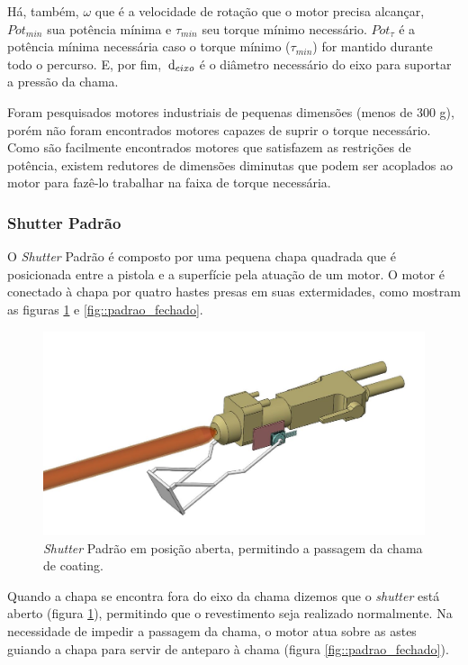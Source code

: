 Há, também, $\omega$ que é a velocidade de rotação que o motor precisa alcançar,
$Pot_{min}$ sua potência mínima e $\tau_{min}$ seu torque mínimo necessário.
$Pot_{\tau}$ é a potência mínima necessária caso o torque mínimo ($\tau_{min}$)
for mantido durante todo o percurso. E, por fim, $\,\mathrm{d}_{eixo}$ é o diâmetro necessário do eixo para suportar a
pressão da chama.

Foram pesquisados motores industriais de pequenas dimensões (menos de 300 g),
porém não foram encontrados motores capazes de suprir o torque necessário. Como
são facilmente encontrados motores que satisfazem as restrições de potência,
existem redutores de dimensões diminutas que podem ser acoplados ao motor para
fazê-lo trabalhar na faixa de torque necessária.


\subsubsection{Shutter Padrão}

O \textit{Shutter} Padrão é composto por uma pequena chapa quadrada que é
posicionada entre a pistola e a superfície pela atuação de um motor. O motor é
conectado à chapa por quatro hastes presas em suas extermidades, como mostram as
figuras \ref{fig::padrao_aberto} e \ref{fig::padrao_fechado}.

\begin{figure}[h!]
\centering
	\includegraphics[width=\columnwidth]{figs/estudo/shutter/Padrao_aberto}
	\caption{\textit{Shutter} Padrão em posição aberta, permitindo a passagem da chama
	de coating.}
	\label{fig::padrao_aberto}
\end{figure}

Quando a chapa se encontra fora do eixo da chama dizemos que
o \textit{shutter} está aberto (figura \ref{fig::padrao_aberto}), permitindo que
o revestimento seja realizado normalmente. Na necessidade de impedir a
passagem da chama, o motor atua sobre as astes guiando a chapa para servir de
anteparo à chama (figura \ref{fig::padrao_fechado}).

